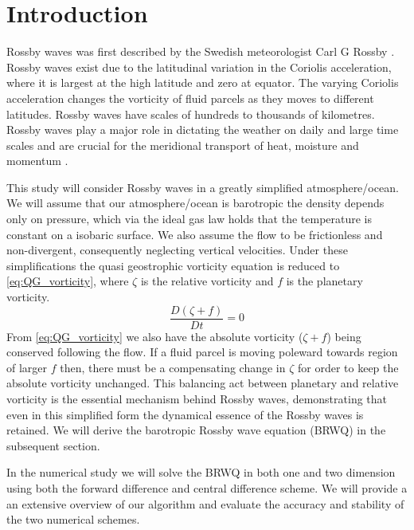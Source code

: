 \section{Introduction}
Rossby waves was first described by the Swedish meteorologist Carl G Rossby
\parencite{Rossby1939}. Rossby waves exist due to the latitudinal variation in
the Coriolis acceleration, where it is largest at the high latitude and zero at
equator. The varying Coriolis acceleration changes the vorticity of fluid
parcels as they moves to different latitudes. Rossby waves have scales of
hundreds to thousands of kilometres. Rossby waves play a major role in dictating
the weather on daily and large time scales and are crucial for the meridional
transport of heat, moisture and momentum \parencite{midSynDyn}.  

This study will consider Rossby waves in a greatly simplified 
atmosphere/ocean. We will assume that our atmosphere/ocean is barotropic the
density depends only on pressure, which via the ideal gas law holds that the
temperature is constant
on a isobaric surface. We also assume the flow to be frictionless and
non-divergent, consequently neglecting vertical velocities. Under these
simplifications the quasi geostrophic vorticity equation is reduced to
\cref{eq:QG_vorticity}, where $\zeta$ is the relative vorticity and $f$ is the
planetary vorticity. 
\begin{equation}\label{eq:QG_vorticity}
    \frac{D(\zeta + f)}{Dt} = 0
\end{equation}
From \cref{eq:QG_vorticity} we also have the absolute vorticity
($\zeta + f$) being conserved following the flow. If a fluid parcel is moving
poleward towards region of larger $f$ then, there must be a compensating change
in $\zeta$ for order to keep the absolute vorticity unchanged. This balancing
act between planetary and relative vorticity is the essential mechanism behind
Rossby waves, demonstrating that even in this simplified form the dynamical
essence of the Rossby waves is retained. We will derive the barotropic Rossby
wave equation (BRWQ) in the subsequent section.

In the numerical study we will solve the BRWQ in both one and two dimension
using both the forward difference and central difference scheme. We will provide
a an extensive overview of our algorithm and evaluate the accuracy and stability
of the two numerical schemes. 